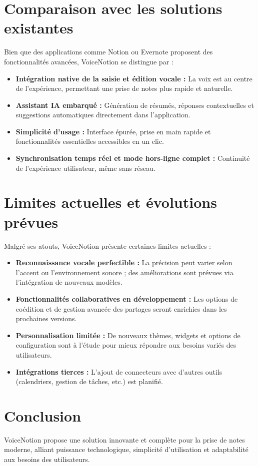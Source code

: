 \section{Comparaison avec les solutions existantes}
Bien que des applications comme Notion ou Evernote proposent des fonctionnalités avancées, VoiceNotion se distingue par :
\begin{itemize}
    \item \textbf{Intégration native de la saisie et édition vocale :} La voix est au centre de l’expérience, permettant une prise de notes plus rapide et naturelle.
    \item \textbf{Assistant IA embarqué :} Génération de résumés, réponses contextuelles et suggestions automatiques directement dans l’application.
    \item \textbf{Simplicité d’usage :} Interface épurée, prise en main rapide et fonctionnalités essentielles accessibles en un clic.
    \item \textbf{Synchronisation temps réel et mode hors-ligne complet :} Continuité de l’expérience utilisateur, même sans réseau.
\end{itemize}

\section{Limites actuelles et évolutions prévues}
Malgré ses atouts, VoiceNotion présente certaines limites actuelles :
\begin{itemize}
    \item \textbf{Reconnaissance vocale perfectible :} La précision peut varier selon l’accent ou l’environnement sonore ; des améliorations sont prévues via l’intégration de nouveaux modèles.
    \item \textbf{Fonctionnalités collaboratives en développement :} Les options de coédition et de gestion avancée des partages seront enrichies dans les prochaines versions.
    \item \textbf{Personnalisation limitée :} De nouveaux thèmes, widgets et options de configuration sont à l’étude pour mieux répondre aux besoins variés des utilisateurs.
    \item \textbf{Intégrations tierces :} L’ajout de connecteurs avec d’autres outils (calendriers, gestion de tâches, etc.) est planifié.
\end{itemize}

\section*{Conclusion}
VoiceNotion propose une solution innovante et complète pour la prise de notes moderne, alliant puissance technologique, simplicité d’utilisation et adaptabilité aux besoins des utilisateurs.
